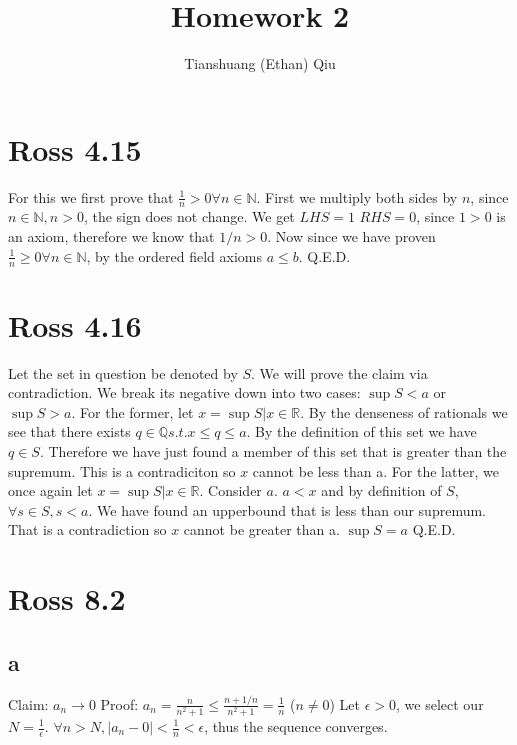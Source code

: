 \documentclass[12pt]{article}
\author{Tianshuang (Ethan) Qiu}
\newcommand{\N}{\mathbb{N}}
\newcommand{\R}{\mathbb{R}}
\newcommand{\Q}{\mathbb{Q}}
\begin{document}
\title{Homework 2}
\maketitle
\newpage

\section{Ross 4.15}
For this we first prove that $\frac{1}{n}>0 \forall n \in \N$. First we multiply both sides by $n$, since $n \in \N, n > 0$, the sign does not change.
\newline
We get $LHS = 1$ $RHS = 0$, since $1 > 0$ is an axiom, therefore we know that $1/n > 0$.
\newline
Now since we have proven $\frac{1}{n} \geq 0 \forall n \in \N$, by the ordered field axioms $a \leq b$.
\newline
Q.E.D.
\newpage


\section{Ross 4.16}
Let the set in question be denoted by $S$. We will prove the claim via contradiction. We break its negative down into two cases: $\sup S < a$ or $\sup S > a$.
\newline
For the former, let $x = \sup S | x \in \R$. By the denseness of rationals we see that there exists $q \in \Q s.t. x \leq q \leq a$. By the definition of this set we have $q \in S$. Therefore we have just found a member of this set that is greater than the supremum. This is a contradiciton so $x$ cannot be less than a.
\newline
For the latter, we once again let $x = \sup S | x \in \R$. Consider $a$. $a<x$ and by definition of $S$, $\forall s \in S, s<a$. We have found an upperbound that is less than our supremum. That is a contradiction so $x$ cannot be greater than a.
\newline
$\sup S = a$ Q.E.D.
\newpage

\section{Ross 8.2}
\subsection{a}
Claim: $a_n \to 0$
\newline
Proof: $a_n = \frac{n}{n^2+1} \leq \frac{n+1/n}{n^2+1} = \frac{1}{n}$ ($n \neq 0$)
\newline
Let $\epsilon > 0$, we select our $N = \frac{1}{\epsilon}$. $\forall n>N, |a_n-0| < \frac{1}{n} < \epsilon$, thus the sequence converges.
\end{document}
